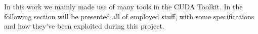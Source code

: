 %	
In this work we mainly made use of many tools in the CUDA Toolkit. In the following section will be presented all of employed stuff, with some specifications and how they've been exploited during this project.

